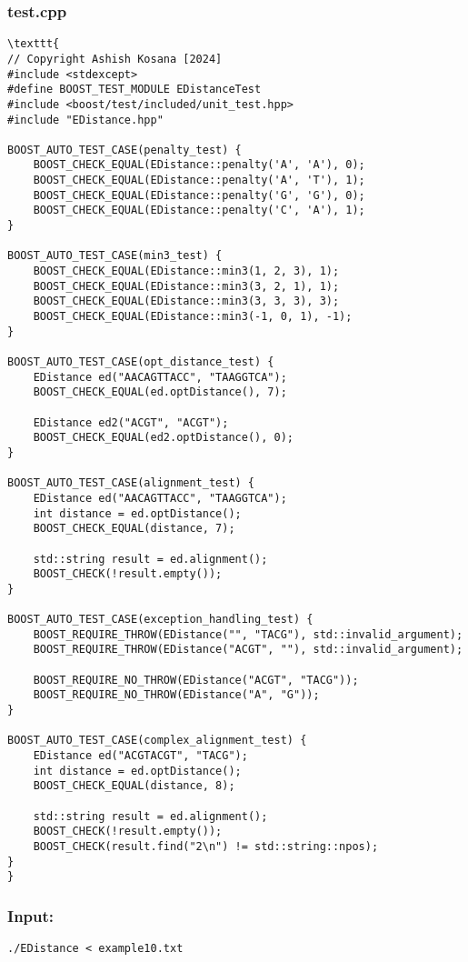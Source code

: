 \documentclass[12pt]{article}
\begin{document}
\subsubsection{test.cpp}
\begin{lstlisting}[style=cppcode]
\texttt{ 
// Copyright Ashish Kosana [2024]
#include <stdexcept>
#define BOOST_TEST_MODULE EDistanceTest
#include <boost/test/included/unit_test.hpp>
#include "EDistance.hpp"

BOOST_AUTO_TEST_CASE(penalty_test) {
    BOOST_CHECK_EQUAL(EDistance::penalty('A', 'A'), 0);
    BOOST_CHECK_EQUAL(EDistance::penalty('A', 'T'), 1);
    BOOST_CHECK_EQUAL(EDistance::penalty('G', 'G'), 0);
    BOOST_CHECK_EQUAL(EDistance::penalty('C', 'A'), 1);
}

BOOST_AUTO_TEST_CASE(min3_test) {
    BOOST_CHECK_EQUAL(EDistance::min3(1, 2, 3), 1);
    BOOST_CHECK_EQUAL(EDistance::min3(3, 2, 1), 1);
    BOOST_CHECK_EQUAL(EDistance::min3(3, 3, 3), 3);
    BOOST_CHECK_EQUAL(EDistance::min3(-1, 0, 1), -1);
}

BOOST_AUTO_TEST_CASE(opt_distance_test) {
    EDistance ed("AACAGTTACC", "TAAGGTCA");
    BOOST_CHECK_EQUAL(ed.optDistance(), 7);

    EDistance ed2("ACGT", "ACGT");
    BOOST_CHECK_EQUAL(ed2.optDistance(), 0);
}

BOOST_AUTO_TEST_CASE(alignment_test) {
    EDistance ed("AACAGTTACC", "TAAGGTCA");
    int distance = ed.optDistance();
    BOOST_CHECK_EQUAL(distance, 7);

    std::string result = ed.alignment();
    BOOST_CHECK(!result.empty());
}

BOOST_AUTO_TEST_CASE(exception_handling_test) {
    BOOST_REQUIRE_THROW(EDistance("", "TACG"), std::invalid_argument);
    BOOST_REQUIRE_THROW(EDistance("ACGT", ""), std::invalid_argument);

    BOOST_REQUIRE_NO_THROW(EDistance("ACGT", "TACG"));
    BOOST_REQUIRE_NO_THROW(EDistance("A", "G"));
}

BOOST_AUTO_TEST_CASE(complex_alignment_test) {
    EDistance ed("ACGTACGT", "TACG");
    int distance = ed.optDistance();
    BOOST_CHECK_EQUAL(distance, 8);

    std::string result = ed.alignment();
    BOOST_CHECK(!result.empty());
    BOOST_CHECK(result.find("2\n") != std::string::npos);
}
}
\end{lstlisting}
\newpage
\subsubsection{Input:}
\begin{lstlisting}[style=cppcode]
./EDistance < example10.txt
\end{lstlisting}
\end{document}
